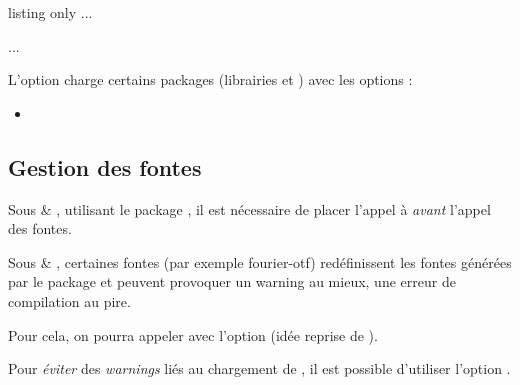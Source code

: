 \begin{PresCodeTexPL}{listing only}
...
\usepackage[build]{ProfLycee}
...
\end{PresCodeTexPL}

\begin{noteblock}
L'option  charge certains packages (librairies  et ) avec les options :

\begin{itemize}
	\item {}
\end{itemize}
\vspace*{-\baselineskip}\leavevmode
\end{noteblock}

\subsection{Gestion des fontes}\label{amssymb}

\begin{warningblock}
 Sous  \& ,  utilisant le package , il est nécessaire de placer l'appel à  {\em avant} l'appel des fontes.

\smallskip

Sous  \& , certaines fontes (par exemple \textsf{fourier-otf}) redéfinissent les fontes générées par le package  et peuvent provoquer un \og warning \fg{} au mieux, une erreur de compilation au pire.

\smallskip

Pour cela, on pourra appeler  avec l'option  (idée reprise de ).

\smallskip

Pour \textit{éviter} des \textit{warnings} liés au chargement de , il est possible d'utiliser l'option .
\end{warningblock}


